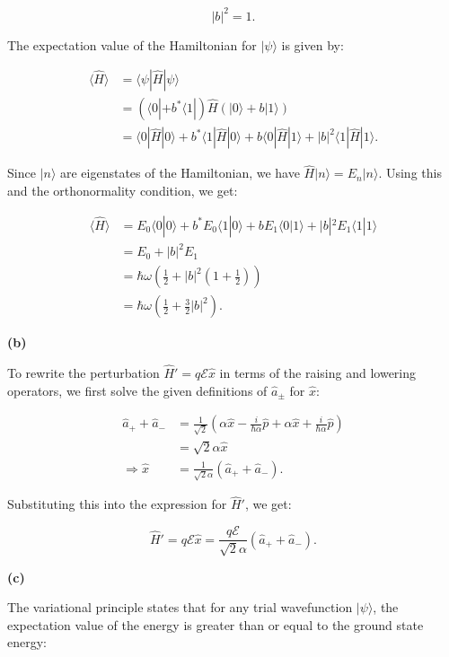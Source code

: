 \documentclass{article}
\begin{document}
\[
|b|^2 = 1.
\]

The expectation value of the Hamiltonian for \(|\psi\rangle\) is given by:

\begin{align*}
\langle \hat{H} \rangle &= \langle \psi | \hat{H} | \psi \rangle \\
&= (\langle 0 | + b^* \langle 1 |)\hat{H}(|0\rangle + b |1\rangle) \\
&= \langle 0 | \hat{H} | 0 \rangle + b^* \langle 1 | \hat{H} | 0 \rangle + b \langle 0 | \hat{H} | 1 \rangle + |b|^2 \langle 1 | \hat{H} | 1 \rangle.
\end{align*}

Since \(|n\rangle\) are eigenstates of the Hamiltonian, we have \(\hat{H} |n\rangle = E_n |n\rangle\). Using this and the orthonormality condition, we get:

\begin{align*}
\langle \hat{H} \rangle &= E_0 \langle 0 | 0 \rangle + b^* E_0 \langle 1 | 0 \rangle + b E_1 \langle 0 | 1 \rangle + |b|^2 E_1 \langle 1 | 1 \rangle \\
&= E_0 + |b|^2 E_1 \\
&= \hbar \omega \left( \frac{1}{2} + |b|^2 \left( 1 + \frac{1}{2} \right) \right) \\
&= \hbar \omega \left( \frac{1}{2} + \frac{3}{2} |b|^2 \right).
\end{align*}

\textbf{(b)} 

To rewrite the perturbation \(\hat{H}' = q \mathcal{E} \hat{x}\) in terms of the raising and lowering operators, we first solve the given definitions of \(\hat{a}_\pm\) for \(\hat{x}\):

\begin{align*}
\hat{a}_+ + \hat{a}_- &= \frac{1}{\sqrt{2}} \left( \alpha \hat{x} - \frac{i}{\hbar \alpha} \hat{p} + \alpha \hat{x} + \frac{i}{\hbar \alpha} \hat{p} \right) \\
&= \sqrt{2} \alpha \hat{x} \\
\Rightarrow \hat{x} &= \frac{1}{\sqrt{2} \alpha} (\hat{a}_+ + \hat{a}_-).
\end{align*}

Substituting this into the expression for \(\hat{H}'\), we get:

\[
\hat{H}' = q \mathcal{E} \hat{x} = \frac{q \mathcal{E}}{\sqrt{2} \alpha} (\hat{a}_+ + \hat{a}_-).
\]

\textbf{(c)} 

The variational principle states that for any trial wavefunction \(|\psi\rangle\), the expectation value of the energy is greater than or equal to the ground state energy:
\end{document}
